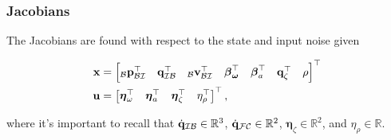 \documentclass{beamer}
\begin{document}
\begin{frame}
\frametitle{Jacobians}
The Jacobians are found with respect to the state and input noise
given

\begin{align}
{\bf x} & =\begin{bmatrix}_{\mathcal{B}}{\bf p}_{\mathcal{B}\mathcal{I}}^{\top} & {\bf q}_{\mathcal{I}\mathcal{B}}^{\top} & _{\mathcal{B}}{\bf v}_{\mathcal{B}\mathcal{I}}^{\top} & \boldsymbol{\beta}_{\boldsymbol{\omega}}^{\top} & \boldsymbol{\beta}_{a}^{\top} & {\bf q}_{\zeta}^{\top} & \rho\end{bmatrix}^{\top}\\
{\bf u} & =\begin{bmatrix}\boldsymbol{\eta}_{\omega}^{\top} & \boldsymbol{\eta}_{a}^{\top} & \boldsymbol{\eta}_{\zeta}^{\top} & \eta_{\rho}^{\top}\end{bmatrix}^{\top},
\end{align}


where it's important to recall that $\dot{{\bf q}}_{\mathcal{I}\mathcal{B}}\in\mathbb{R}^{3}$,
$\dot{{\bf q}}_{\mathcal{F}\mathcal{C}}\in\mathbb{R}^{2}$, $\boldsymbol{\eta}_{\zeta}\in\mathbb{R}^{2}$,
and $\eta_{\rho}\in\mathbb{R}$. 
\end{frame}
\end{document}

